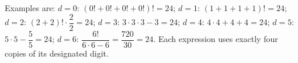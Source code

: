 Examples are: $d=0$: $(0!+0!+0!+0!)!=24$; $d=1$: $(1+1+1+1)!=24$; $d=2$: $(2+2)!\cdot\dfrac{2}{2}=24$; $d=3$: $3\cdot3\cdot3-3=24$; $d=4$: $4\cdot4+4+4=24$; $d=5$: $5\cdot5-\dfrac{5}{5}=24$; $d=6$: $\dfrac{6!}{6\cdot6-6}=\dfrac{720}{30}=24$. Each expression uses exactly four copies of its designated digit.
